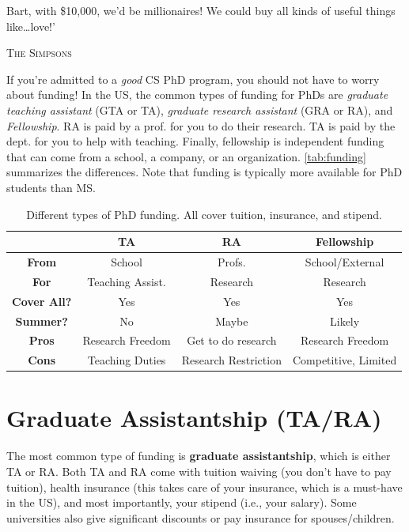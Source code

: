 \documentclass[oneside,11pt,dvipsnames]{book}
\begin{document}
\epigraph{Bart, with \$10,000, we’d be millionaires! We could buy all kinds of useful things like…love!’}{\textsc{The Simpsons}}
If you're admitted to a \emph{good} CS PhD program, you should not have to worry about funding!
In the US, the common types of funding for PhDs are \emph{graduate teaching assistant} (GTA or TA), \emph{graduate research assistant} (GRA or RA), and \emph{Fellowship}.
RA is paid by a prof. for you to do their research. TA is paid by the dept. for you to help with teaching. Finally, fellowship is independent funding that can come from a school, a company, or an organization. \autoref{tab:funding} summarizes the differences.
Note that funding is typically more available for PhD students than
MS.

\begin{table}
  \centering
  \small
  \caption{Different types of PhD funding. All cover tuition, insurance, and stipend.}\label{tab:funding}
  \begin{tabular}{c|c|c|c}
    \toprule
    &\textbf{TA}&\textbf{RA}&\textbf{Fellowship}\\
    \midrule
    \textbf{From} & School & Profs. & School/External\\
    \textbf{For}                  & Teaching Assist.       & Research                        & Research                              \\
    \textbf{Cover All?} & Yes                      & Yes                             & Yes                                   \\
    \textbf{Summer?}              & No                       & Maybe                           & Likely                                   \\
    \midrule
    \textbf{Pros}                 & Research Freedom         & Get to do research              & Research Freedom                      \\
    \textbf{Cons}                 & Teaching Duties           & Research Restriction & Competitive, Limited             \\
    \bottomrule
  \end{tabular}
\end{table}

\section{Graduate Assistantship (TA/RA)}\label{sec:ta-ra}
The most common type of funding is \textbf{graduate assistantship}, which is either TA or RA. Both TA and RA come with tuition waiving (you don't have to pay tuition), health insurance (this takes care of your insurance, which is a must-have in the US), and most importantly, your stipend (i.e., your salary). Some universities also give significant discounts or pay insurance for spouses/children.
\end{document}
